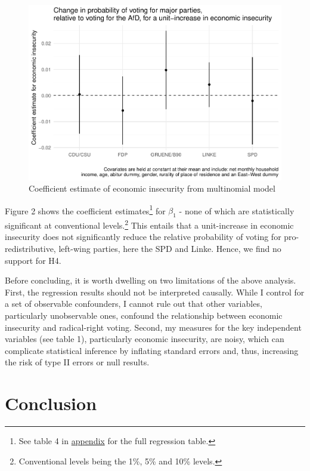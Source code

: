 \documentclass[
]{article}
\begin{document}
\begin{figure}
\centering
\includegraphics{AVCD_Final-Assignment-Edenhofer_files/figure-latex/multinomial-model-plot-1.pdf}
\caption{Coefficient estimate of economic insecurity from multinomial
model}
\end{figure}

Figure 2 shows the coefficient estimates\footnote{See table 4 in
  \protect\hyperlink{appendix}{appendix} for the full regression table.}
for \(\beta_{1}\) - none of which are statistically significant at
conventional levels.\footnote{Conventional levels being the 1\%, 5\% and
  10\% levels.} This entails that a unit-increase in economic insecurity
does not significantly reduce the relative probability of voting for
pro-redistributive, left-wing parties, here the SPD and Linke. Hence, we
find no support for H4.

Before concluding, it is worth dwelling on two limitations of the above
analysis. First, the regression results should not be interpreted
causally. While I control for a set of observable confounders, I cannot
rule out that other variables, particularly unobservable ones, confound
the relationship between economic insecurity and radical-right voting.
Second, my measures for the key independent variables (see table 1),
particularly economic insecurity, are noisy, which can complicate
statistical inference by inflating standard errors and, thus, increasing
the risk of type II errors or null results.

\hypertarget{conclusion}{%
\section{Conclusion}\label{conclusion}}
\end{document}
